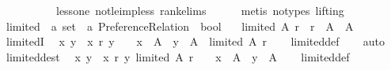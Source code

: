 \begin{isabellebody}
\ \ \ \ \ \ \ \ \ \ less{\isacharunderscore}{\kern0pt}one\ not{\isacharunderscore}{\kern0pt}le{\isacharunderscore}{\kern0pt}imp{\isacharunderscore}{\kern0pt}less\ rank{\isachardot}{\kern0pt}elims\isanewline
\ \ \ \ \isamarkupfalse%
\ {\isacharparenleft}{\kern0pt}metis\ {\isacharparenleft}{\kern0pt}no{\isacharunderscore}{\kern0pt}types{\isacharcomma}{\kern0pt}\ lifting{\isacharparenright}{\kern0pt}{\isacharparenright}{\kern0pt}\isanewline
{}\isamarkupfalse%
%
\endisatagproof
{\isafoldproof}%
%
\isadelimproof
%
\endisadelimproof
%
\isadelimdocument
%
\endisadelimdocument
%
\isatagdocument
%
\isamarkuptrue%
%
\endisatagdocument
{\isafolddocument}%
%
\isadelimdocument
%
\endisadelimdocument
{}\isamarkupfalse%
\ limited\ {\isacharcolon}{\kern0pt}{\isacharcolon}{\kern0pt}\ {\isachardoublequoteopen}{\isacharprime}{\kern0pt}a\ set\ {\isasymRightarrow}\ {\isacharprime}{\kern0pt}a\ Preference{\isacharunderscore}{\kern0pt}Relation\ {\isasymRightarrow}\ bool{\isachardoublequoteclose}\ \isanewline
\ \ {\isachardoublequoteopen}limited\ A\ r\ {\isasymequiv}\ r\ {\isasymsubseteq}\ A\ {\isasymtimes}\ A{\isachardoublequoteclose}\isanewline
\isanewline
{}\isamarkupfalse%
\ limitedI{\isacharcolon}{\kern0pt}\isanewline
\ \ {\isachardoublequoteopen}{\isacharparenleft}{\kern0pt}{\isasymAnd}x\ y{\isachardot}{\kern0pt}\ {\isasymlbrakk}\ x\ {\isasympreceq}\isactrlsub r\ y\ {\isasymrbrakk}\ {\isasymLongrightarrow}\ \ x\ {\isasymin}\ A\ {\isasymand}\ y\ {\isasymin}\ A{\isacharparenright}{\kern0pt}\ {\isasymLongrightarrow}\ limited\ A\ r{\isachardoublequoteclose}\isanewline
%
\isadelimproof
\ \ %
\endisadelimproof
%
\isatagproof
{}\isamarkupfalse%
\ limited{\isacharunderscore}{\kern0pt}def\isanewline
\ \ \isamarkupfalse%
\ auto%
\endisatagproof
{\isafoldproof}%
%
\isadelimproof
\isanewline
%
\endisadelimproof
\isanewline
{}\isamarkupfalse%
\ limited{\isacharunderscore}{\kern0pt}dest{\isacharcolon}{\kern0pt}\isanewline
\ \ {\isachardoublequoteopen}{\isacharparenleft}{\kern0pt}{\isasymAnd}x\ y{\isachardot}{\kern0pt}\ {\isasymlbrakk}\ x\ {\isasympreceq}\isactrlsub r\ y{\isacharsemicolon}{\kern0pt}\ limited\ A\ r\ {\isasymrbrakk}\ {\isasymLongrightarrow}\ \ x\ {\isasymin}\ A\ {\isasymand}\ y\ {\isasymin}\ A{\isacharparenright}{\kern0pt}{\isachardoublequoteclose}\isanewline
%
\isadelimproof
\ \ %
\endisadelimproof
%
\isatagproof
{}\isamarkupfalse%
\ limited{\isacharunderscore}{\kern0pt}def\isanewline

\end{isabellebody}
